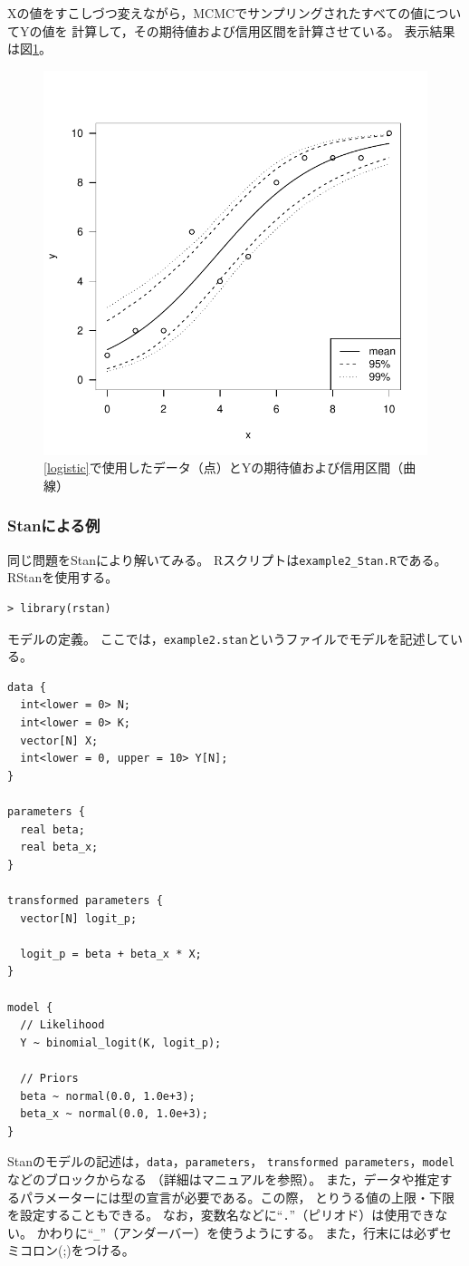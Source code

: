\documentclass[11pt,uplatex]{jsarticle}
\begin{document}
Xの値をすこしづつ変えながら，MCMCでサンプリングされたすべての値についてYの値を
計算して，その期待値および信用区間を計算させている。
表示結果は図\ref{example2exp_plot}。
\begin{figure}[htbp]
  \begin{center}
    \includegraphics[bb=0 0 360 360, clip, width=240 bp]{example2_exp.pdf}
  \end{center}
  \caption{\ref{logistic}で使用したデータ（点）とYの期待値および信用区間（曲線）}
  \label{example2exp_plot}
\end{figure}


\subsubsection{Stanによる例}
同じ問題を\textsf{Stan}により解いてみる。
\textsf{R}スクリプトは\texttt{example2\_Stan.R}である。
RStanを使用する。
%
\begin{lstlisting}
> library(rstan)
\end{lstlisting}

モデルの定義。
ここでは，\texttt{example2.stan}というファイルでモデルを記述している。
%
\begin{lstlisting}
data {
  int<lower = 0> N;
  int<lower = 0> K;
  vector[N] X;
  int<lower = 0, upper = 10> Y[N];
}

parameters {
  real beta;
  real beta_x;
}

transformed parameters {
  vector[N] logit_p;

  logit_p = beta + beta_x * X;
}

model {
  // Likelihood
  Y ~ binomial_logit(K, logit_p);

  // Priors
  beta ~ normal(0.0, 1.0e+3);
  beta_x ~ normal(0.0, 1.0e+3);
}
\end{lstlisting}
\noindent
Stanのモデルの記述は，\texttt{data}，\texttt{parameters}，
\texttt{transformed parameters}，\texttt{model}などのブロックからなる
（詳細はマニュアルを参照）。
また，データや推定するパラメーターには型の宣言が必要である。この際，
とりうる値の上限・下限を設定することもできる。
なお，変数名などに``\texttt{.}''（ピリオド）は使用できない。
かわりに``\texttt{\_}''（アンダーバー）を使うようにする。
また，行末には必ずセミコロン(;)をつける。
\end{document}
